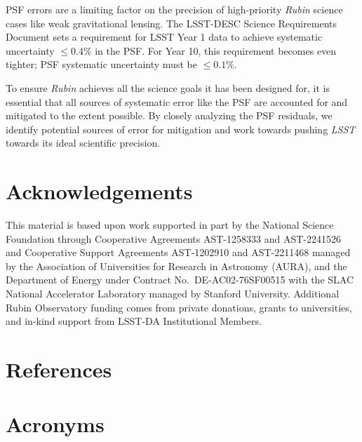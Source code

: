 \documentclass[SE,lsstdraft,authoryear,toc]{lsstdoc}
\begin{document}
PSF errors are a limiting factor on the precision of high-priority \textit{Rubin} science cases like weak gravitational lensing. 
The LSST-DESC Science Requirements Document \cite{2018arxiv180901669T} sets a requirement for LSST Year 1 data to achieve systematic uncertainty $\leq 0.4\%$ in the PSF.
For Year 10, this requirement becomes even tighter; PSF systematic uncertainty must be $\leq 0.1\%$.

To ensure \textit{Rubin} achieves all the science goals it has been designed for, it is essential that all sources of systematic error like the PSF are accounted for and mitigated to the extent possible. 
By closely analyzing the PSF residuals, we identify potential sources of error for mitigation and work towards pushing \textit{LSST} towards its ideal scientific precision. 

\appendix

\section{Acknowledgements}

This material is based upon work supported in part by the National Science Foundation through Cooperative Agreements AST-1258333 and AST-2241526 and Cooperative Support Agreements AST-1202910 and AST-2211468 managed by the Association of Universities for Research in Astronomy (AURA), and the Department of Energy under Contract No.\ DE-AC02-76SF00515 with the SLAC National Accelerator Laboratory managed by Stanford University.
Additional Rubin Observatory funding comes from private donations, grants to universities, and in-kind support from LSST-DA Institutional Members.

\section{References} \label{sec:bib}
\renewcommand{\refname}{} %


\section{Acronyms} \label{sec:acronyms}

\end{document}
